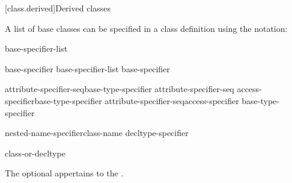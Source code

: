 [class.derived]{Derived classes}%



\pnum
{}%
%
%
A list of base classes can be specified in a class definition using
the notation:

\begin{bnf}
\br
    \terminal{:} base-specifier-list
\end{bnf}


\begin{bnf}
\br
    base-specifier \opt\br
    base-specifier-list \terminal{,} base-specifier \opt
\end{bnf}

\begin{bnf}
\br
    attribute-specifier-seq\opt base-type-specifier\br
    attribute-specifier-seq\opt {} access-specifier\opt base-type-specifier\br
    attribute-specifier-seq\opt access-specifier \opt base-type-specifier
\end{bnf}

\begin{bnf}
\br
    nested-name-specifier\opt class-name\br
    decltype-specifier
\end{bnf}

\begin{bnf}
\br
    class-or-decltype
\end{bnf}

%
%
\begin{bnf}
\br
    \br
    \br
\end{bnf}

The optional  appertains to the .

